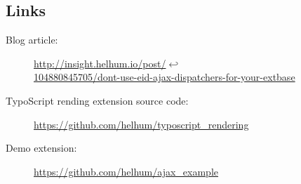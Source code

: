 \subsection{Links}

\begin{description}
  \item[Blog article:] \url{http://insight.helhum.io/post/}$\hookleftarrow$\\ \url{104880845705/dont-use-eid-ajax-dispatchers-for-your-extbase}
  \item[TypoScript rending extension source code:] \url{https://github.com/helhum/typoscript_rendering}
  \item[Demo extension:] \url{https://github.com/helhum/ajax_example}
\end{description}
